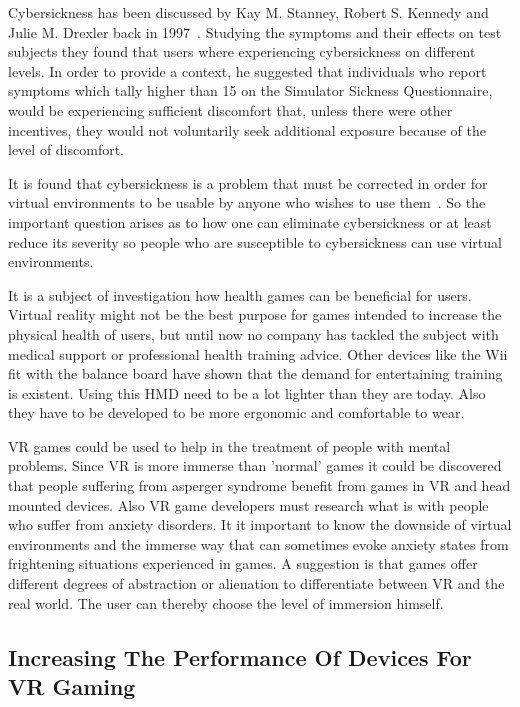Cybersickness has been discussed by Kay M. Stanney, Robert S. Kennedy and Julie M. Drexler back in 1997~\cite{stanney1997cybersickness}. Studying the symptoms and their effects on test subjects they found that users where experiencing cybersickness on different levels. In order to provide a context, he suggested that individuals who report symptoms which tally higher than 15 on the Simulator Sickness Questionnaire, would be experiencing sufficient discomfort that, unless there were other incentives, they would not voluntarily seek additional exposure because of the level of discomfort. 

It is found that cybersickness is a problem that must be corrected in order for virtual environments to be usable by anyone who wishes to use them~\cite{lo2001cybersickness}. So the important question arises as to how one can eliminate cybersickness or at least reduce its severity so people who are susceptible to cybersickness can use virtual environments.

It is a subject of investigation how health games can be beneficial for users. Virtual reality might not be the best purpose for games intended to increase the physical health of users, but until now no company has tackled the subject with medical support or professional health training advice. Other devices like the Wii fit with the balance board have shown that the demand for entertaining training is existent.
Using this HMD need to be a lot lighter than they are today. Also they have to be developed to be more ergonomic and comfortable to wear.

VR games could be used to help in the treatment of people with mental problems. Since VR is more immerse than 'normal' games it could be discovered that people suffering from asperger syndrome benefit from games in VR and head mounted devices.
Also VR game developers must research what is with people who suffer from anxiety disorders. It it important to know the downside of virtual environments and the immerse way that can sometimes evoke anxiety states from frightening situations experienced in games. A suggestion is that games offer different degrees of abstraction or alienation to differentiate between VR and the real world. The user can thereby choose the level of immersion himself.

\subsection{Increasing The Performance Of Devices For VR Gaming}

